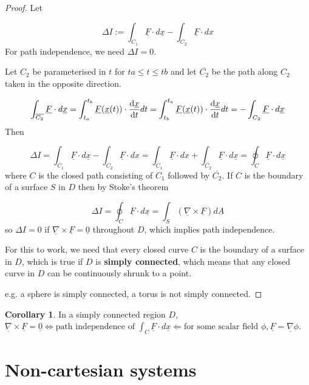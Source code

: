 \documentclass[12pt,a4paper]{article}
\theoremstyle{definition}
\newtheorem{corollary}[definition]{Corollary}
\begin{document}
\begin{proof}
	Let

	\[ \Delta I := \int_{C_1} \underline{F} \cdot d\underline{x} - \int_{C_2} \underline{F} \cdot dx \]
	For path independence, we need $\Delta I = 0$.

	Let $C_2$ be parameterised in $t$ for $ta \le t \le tb$ and let $\overline{C_2}$ be the path along $C_2$ taken in the opposite direction.

	\[ \int_{\overline{C_2}} \underline{F} \cdot d\underline{x} = \int_{t_a}^{t_b} \underline{F}(\underline{x}(t)) \cdot \diff{\underline{x}}{t} dt = \int_{t_b}^{t_a} \underline{F}(\underline{x}(t)) \cdot \diff{\underline{x}}{t} dt = -\int_{C_2} \underline{F} \cdot d\underline{x} \]
	Then
	
	\[ \Delta I = \int_{C_1} \underline{F} \cdot d\underline{x} - \int_{C_2} \underline{F} \cdot dx = \int_{C_1} \underline{F} \cdot dx + \int_{\overline{C_2}} \underline{F} \cdot d\underline{x} = \oint_C \underline{F} \cdot d\underline{x} \]
	where $C$ is the closed path consisting of $C_1$ followed by $\overline{C_2}$. If $C$ is the boundary of a surface $S$ in $D$ then by Stoke's theorem

	\[ \Delta I = \oint_C \underline{F} \cdot d\underline{x} = \int_S (\underline{\nabla} \times \underline{F}) d\underline{A} \]
	so $\Delta I = 0$ if $\underline{\nabla} \times \underline{F} = \underline{0}$ throughout $D$, which implies path independence.

	For this to work, we need that every closed curve $C$ is the boundary of a surface in $D$, which is true if $D$ is \textbf{simply connected}, which means that any closed curve in $D$ can be continuously shrunk to a point.

	e.g. a sphere is simply connected, a torus is not simply connected.
\end{proof}

\begin{corollary}
	In a simply connected region $D$, $\underline{\nabla} \times \underline{F} = \underline{0} \Leftrightarrow \text{path independence of } \int_C \underline{F} \cdot d\underline{x} \Leftarrow \text{for some scalar field } \phi, \underline{F} = \underline{\nabla} \phi$.
\end{corollary}

\section{Non-cartesian systems}
\end{document}
